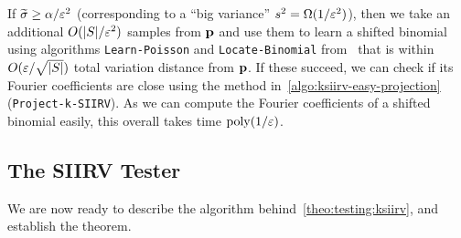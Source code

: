  If $\widetilde{\sigma} \geq \alpha/\varepsilon^2$ (corresponding to a ``big variance'' $s^2 = \Omega(1/\varepsilon^2)$), then we take an additional $O(|S|/\varepsilon^2)$ samples from $\mathbf{p}$ and use them to learn a shifted binomial using algorithms \texttt{Learn-Poisson} and \texttt{Locate-Binomial} from~\cite{DDS:PBD:15} that is within $O(\varepsilon/\sqrt{|S|})$ total variation distance from $\mathbf{p}$. If these succeed,  we can check if its Fourier coefficients are close using the method in~\cref{algo:ksiirv-easy-projection} (\texttt{Project-k-SIIRV}). As we can compute the Fourier coefficients of a shifted binomial easily, this overall takes time $\operatorname*{poly}(1/\varepsilon)$.
 

 
\subsection{The SIIRV Tester}\label{sec:siirv:testing}
We are now ready to describe the algorithm behind~\cref{theo:testing:ksiirv}, and establish the theorem.
